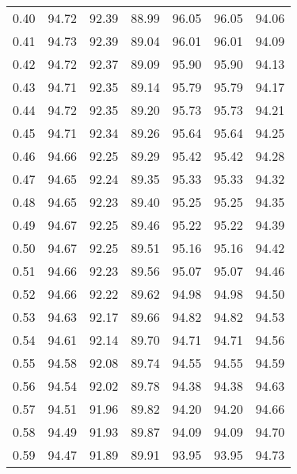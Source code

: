 \begin{tabular}{|c|c|c|c|c|c|c|}
      0.40 &     94.72 &     92.39 &      88.99 &   96.05 &      96.05 &         94.06 \\
      0.41 &     94.73 &     92.39 &      89.04 &   96.01 &      96.01 &         94.09 \\
      0.42 &     94.72 &     92.37 &      89.09 &   95.90 &      95.90 &         94.13 \\
      0.43 &     94.71 &     92.35 &      89.14 &   95.79 &      95.79 &         94.17 \\
      0.44 &     94.72 &     92.35 &      89.20 &   95.73 &      95.73 &         94.21 \\
      0.45 &     94.71 &     92.34 &      89.26 &   95.64 &      95.64 &         94.25 \\
      0.46 &     94.66 &     92.25 &      89.29 &   95.42 &      95.42 &         94.28 \\
      0.47 &     94.65 &     92.24 &      89.35 &   95.33 &      95.33 &         94.32 \\
      0.48 &     94.65 &     92.23 &      89.40 &   95.25 &      95.25 &         94.35 \\
      0.49 &     94.67 &     92.25 &      89.46 &   95.22 &      95.22 &         94.39 \\
      0.50 &     94.67 &     92.25 &      89.51 &   95.16 &      95.16 &         94.42 \\
      0.51 &     94.66 &     92.23 &      89.56 &   95.07 &      95.07 &         94.46 \\
      0.52 &     94.66 &     92.22 &      89.62 &   94.98 &      94.98 &         94.50 \\
      0.53 &     94.63 &     92.17 &      89.66 &   94.82 &      94.82 &         94.53 \\
      0.54 &     94.61 &     92.14 &      89.70 &   94.71 &      94.71 &         94.56 \\
      0.55 &     94.58 &     92.08 &      89.74 &   94.55 &      94.55 &         94.59 \\
      0.56 &     94.54 &     92.02 &      89.78 &   94.38 &      94.38 &         94.63 \\
      0.57 &     94.51 &     91.96 &      89.82 &   94.20 &      94.20 &         94.66 \\
      0.58 &     94.49 &     91.93 &      89.87 &   94.09 &      94.09 &         94.70 \\
      0.59 &     94.47 &     91.89 &      89.91 &   93.95 &      93.95 &         94.73 \\

\end{tabular}

